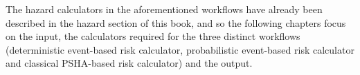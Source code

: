 

The hazard calculators in the aforementioned workflows have already been described in the hazard section of this book, and so the following chapters focus on the input, the calculators required for the three distinct workflows (deterministic event-based risk calculator, probabilistic event-based risk calculator and classical PSHA-based risk calculator) and the output.
%
